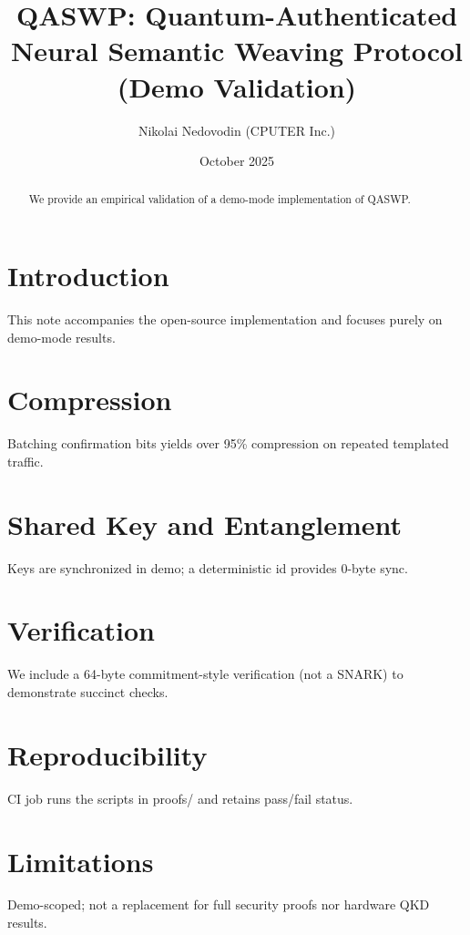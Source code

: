 \documentclass[11pt]{article}
\title{QASWP: Quantum-Authenticated Neural Semantic Weaving Protocol (Demo Validation)}
\author{Nikolai Nedovodin (CPUTER Inc.)}
\date{October 2025}
\begin{document}
\maketitle
\begin{abstract}
We provide an empirical validation of a demo-mode implementation of QASWP.
\end{abstract}
\section{Introduction}
This note accompanies the open-source implementation and focuses purely on demo-mode results.
\section{Compression}
Batching confirmation bits yields over 95\% compression on repeated templated traffic.
\section{Shared Key and Entanglement}
Keys are synchronized in demo; a deterministic id provides 0-byte sync.
\section{Verification}
We include a 64-byte commitment-style verification (not a SNARK) to demonstrate succinct checks.
\section{Reproducibility}
CI job runs the scripts in proofs/ and retains pass/fail status.
\section{Limitations}
Demo-scoped; not a replacement for full security proofs nor hardware QKD results.
\end{document}
